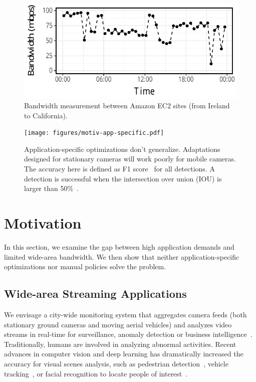 \begin{figure}
  \centering
  \includegraphics[width=.95\linewidth]{figures/aws-variation.pdf}
  \caption{Bandwidth measurement between Amazon EC2 sites (from Ireland to
    California).}
  \label{fig:bw}
\end{figure}

\begin{figure}
  \centering
  \texttt{[image: figures/motiv-app-specific.pdf]}
  \caption{Application-specific optimizations don't generalize. Adaptations
    designed for stationary cameras will work poorly for mobile cameras. The
    accuracy here is defined as F1 score~\cite{Rijsbergen:1979:IR:539927} for
    all detections. A detection is successful when the intersection over union
    (IOU) is larger than 50\%~\cite{everingham2010pascal}.}
  \label{fig:app-specific}
\end{figure}

\section{Motivation}
\label{sec:motivation}

In this section, we examine the gap between high application demands and limited
wide-area bandwidth. We then show that neither application-specific
optimizations nor manual policies solve the problem.

\subsection{Wide-area Streaming Applications}
\label{sec:wide-area-streaming}

 We envisage a city-wide monitoring system that
aggregates camera feeds (both stationary ground cameras and moving aerial
vehicles) and analyzes video streams in real-time for surveillance, anomaly
detection or business intelligence~\cite{oh2011large}. Traditionally, humans are
involved in analyzing abnormal activities. Recent advances in computer vision
and deep learning has dramatically increased the accuracy for visual scenes
analysis, such as pedestrian detection~\cite{dollar2012pedestrian}, vehicle
tracking~\cite{coifman1998real}, or facial recognition to locate people of
interest~\cite{parkhi2015deep, Lu:2015:SHF:2888116.2888245}.


